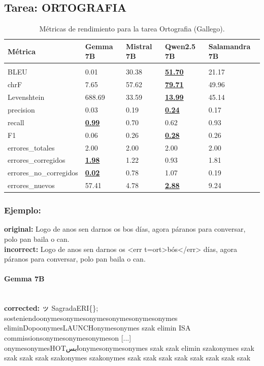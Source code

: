 \subsection{Tarea: ORTOGRAFIA}\label{tarea-ortografia}
\begin{longtable}[]{@{}lllll@{}}
\toprule\noalign{}
Métrica & Gemma 7B & Mistral 7B & Qwen2.5 7B & Salamandra 7B \\
\midrule\noalign{}
\endhead
\bottomrule\noalign{}
\caption{Métricas de rendimiento para la tarea Ortografia (Gallego).}
\label{tab:metricas_ortografia_Gallego}\\
\endlastfoot
BLEU & 0.01 & 30.38 & \textbf{\underline{51.70}} & 21.17 \\
chrF & 7.65 & 57.62 & \textbf{\underline{79.71}} & 49.96 \\
Levenshtein & 688.69 & 33.59 & \textbf{\underline{13.99}} & 45.14 \\
precision & 0.03 & 0.19 & \textbf{\underline{0.24}} & 0.17 \\
recall & \textbf{\underline{0.99}} & 0.70 & 0.62 & 0.93 \\
F1 & 0.06 & 0.26 & \textbf{\underline{0.28}} & 0.26 \\
errores\_totales & 2.00 & 2.00 & 2.00 & 2.00 \\
errores\_corregidos & \textbf{\underline{1.98}} & 1.22 & 0.93 & 1.81 \\
errores\_no\_corregidos & \textbf{\underline{0.02}} & 0.78 & 1.07 & 0.19 \\
errores\_nuevos & 57.41 & 4.78 & \textbf{\underline{2.88}} & 9.24 \\
\end{longtable}

\subsubsection{Ejemplo:}
\textbf{original:} Logo de anos sen darnos os bos días, agora páranos para conversar, polo pan baila o can.\\
\textbf{incorrect:} Logo de anos sen darnos os {\textless}err t=ort{\textgreater}bós{\textless}/err{\textgreater} días, agora páranos para conversar, polo pan baila o can.

\paragraph{Gemma 7B}~\\
\textbf{corrected:} ッ SagradaERI\{\}; sosteniendoonymesonymesonymesonymesonymesonymes eliminDopoonymesLAUNCHonymesonymes szak elimin ISA commissionsonymesonymesonymeson [...] onymesonymesHOTابسonymesonymesonymes szak szak elimin szakonymes szak szak szak szak szakonymes szakonymes szak szak szak szak szak szak szak szak

